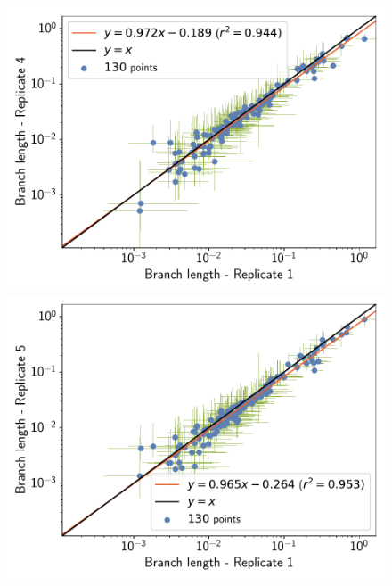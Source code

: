 \documentclass{article}
\begin{document}
\begin{figure}[H]
\begin{minipage}{0.32\linewidth}
			\includegraphics[width=\linewidth, page=1]{isopods/12CDS_SiteMutSelBranchNe_Rep-1-4_Log10BranchLength}
		\end{minipage}
		\begin{minipage}{0.32\linewidth}
			\includegraphics[width=\linewidth, page=1]{isopods/12CDS_SiteMutSelBranchNe_Rep-1-5_Log10BranchLength}
		\end{minipage}
		\begin{minipage}{0.32\linewidth}

\end{minipage}
\end{figure}
\end{document}
